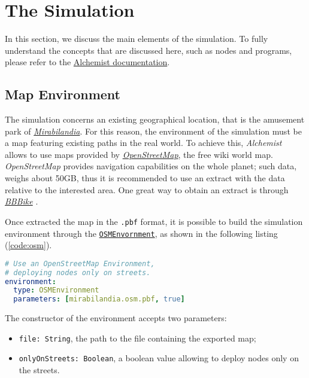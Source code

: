 \usepackage{hyperref}\section{The Simulation}

In this section, we discuss the main elements of the simulation. To fully understand the concepts that are discussed here, such as nodes and programs, please refer to the \href{https://alchemistsimulator.github.io/}{Alchemist documentation}.

\subsection{Map Environment}
The simulation concerns an existing geographical location, that is the amusement park of \href{https://www.mirabilandia.it/}{\textit{Mirabilandia}}. For this reason, the environment of the simulation must be a map featuring existing paths in the real world. To achieve this, \textit{Alchemist} allows to use maps provided by \href{https://www.openstreetmap.org/}{\textit{OpenStreetMap}}, the free wiki world map. \textit{OpenStreetMap} provides navigation capabilities on the whole planet; such data, weighs about 50GB, thus it is recommended to use an extract with the data relative to the interested area. One great way to obtain an extract is through \href{https://extract.bbbike.org/}{\textit{BBBike}} \cite{Pianini_2013}.

Once extracted the map in the \texttt{.pbf} format, it is possible to build the simulation environment through the \href{https://alchemistsimulator.github.io/reference/kdoc/alchemist/it.unibo.alchemist.model.implementations.environments/-o-s-m-environment/}{\texttt{OSMEnvornment}}, as shown in the following listing (\ref{code:osm}).

\begin{lstlisting}[language=yaml, label=code:osm, caption=Building an \textit{OpenStreetMap} environment.]
# Use an OpenStreetMap Environment,
# deploying nodes only on streets.
environment:
  type: OSMEnvironment
  parameters: [mirabilandia.osm.pbf, true]
\end{lstlisting}

\noindent
The constructor of the environment accepts two parameters:
\begin{itemize}
    \item \texttt{file: String}, the path to the file containing the exported map;
    \item \texttt{onlyOnStreets: Boolean}, a boolean value allowing to deploy nodes only on the streets.
\end{itemize}

